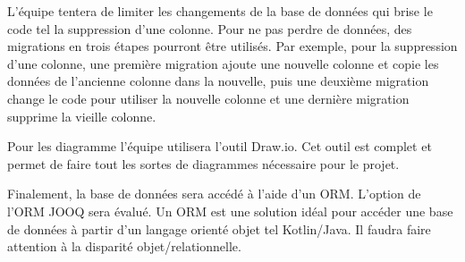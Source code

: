 	L’équipe tentera de limiter les changements de la base de données qui brise le code tel la suppression d’une colonne. Pour ne pas perdre de données, des migrations en trois étapes pourront être utilisés. Par exemple, pour la suppression d’une colonne, une première migration ajoute une nouvelle colonne et copie les données de l’ancienne colonne dans la nouvelle, puis une deuxième migration change le code pour utiliser la nouvelle colonne et une dernière migration supprime la vieille colonne. 

	Pour les diagramme l’équipe utilisera l’outil Draw.io. Cet outil est complet et permet de faire tout les sortes de diagrammes nécessaire pour le projet. 

	Finalement, la base de données sera accédé à l’aide d’un ORM. L’option de l’ORM JOOQ sera évalué. Un ORM est une solution idéal pour accéder une base de données à partir d’un langage orienté objet tel Kotlin/Java. Il faudra faire attention à la disparité objet/relationnelle.

	